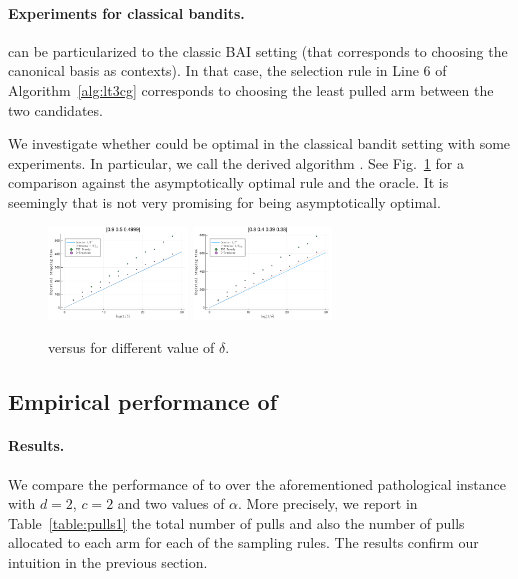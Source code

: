 \paragraph{Experiments for classical bandits.}
\LTCCG can be particularized to the classic BAI setting (that corresponds to choosing the canonical basis as contexts). In that case, the selection rule in Line 6 of Algorithm~\ref{alg:lt3cg} corresponds to choosing the least pulled arm between the two candidates. 

We investigate whether \LTCCG{} could be optimal in the classical bandit setting with some experiments. In particular, we call the derived algorithm \TCCG{}. See Fig.~\ref{fig:convergence} for a comparison against the asymptotically optimal \DT rule and the oracle. It is seemingly that \LTCCG{} is not very promising for being asymptotically optimal.

\begin{figure}[ht]
    \centering
    \includegraphics[width=0.33\textwidth]{Chapter4/img/res1.pdf}
    \includegraphics[width=0.33\textwidth]{Chapter4/img/res2.pdf}
    \caption{\TCCG{} versus \Track{} for different value of $\delta$.}
    \label{fig:convergence}
\end{figure}

\subsection{Empirical performance of \LTCCG{}}
\paragraph{Results.}
We compare the performance of \LTCCG{} to \LGapE{} over the aforementioned pathological instance with $d=2$, $c=2$ and two values of $\alpha$. More precisely, we report in Table~\ref{table:pulls1} the total number of pulls and also the number of pulls allocated to each arm for each of the sampling rules. The results confirm our intuition in the previous section. 

